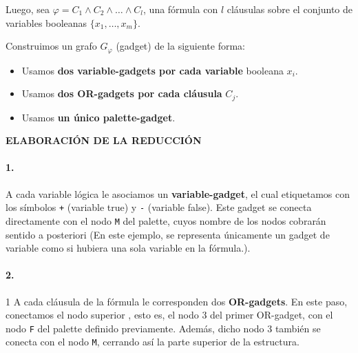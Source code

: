\documentclass[a4paper,12pt]{article}
\begin{document}
\begin{itemize}
\begin{center}
\end{center}


Luego, sea $\varphi = C_1 \land C_2 \land \dots \land C_l$, una fórmula con $l$ cláusulas sobre el conjunto de variables booleanas $\{x_1, \dots, x_m\}$.

Construimos un grafo $G_\varphi$ (gadget) de la siguiente forma:
\begin{itemize}
  \item Usamos \textbf{dos variable-gadgets por cada variable} booleana $x_i$.
  \item Usamos \textbf{dos OR-gadgets por cada cláusula} $C_j$.
  \item Usamos \textbf{un único palette-gadget}.\\
\end{itemize}



\textbf{ELABORACIÓN DE LA REDUCCIÓN}

\paragraph{1.} A cada variable lógica le asociamos un \textbf{variable-gadget}, el cual etiquetamos con los símbolos \texttt{+} (variable true) y \texttt{-} (variable false). Este gadget se conecta directamente con el nodo \texttt{M} del palette, cuyos nombre de los nodos cobrarán sentido a posteriori (En este ejemplo, se representa únicamente un gadget de variable como si hubiera una sola variable en la fórmula.). 

\begin{center}
\end{center}
\paragraph{2.}1 A cada cláusula de la fórmula le corresponden dos \textbf{OR-gadgets}. En este paso, conectamos el nodo superior , esto es, el nodo 3 del primer OR-gadget, con el nodo \texttt{F} del palette definido previamente. Además, dicho nodo 3 también se conecta con el nodo \texttt{M}, cerrando así la parte superior de la estructura.


\end{itemize}
\end{document}
